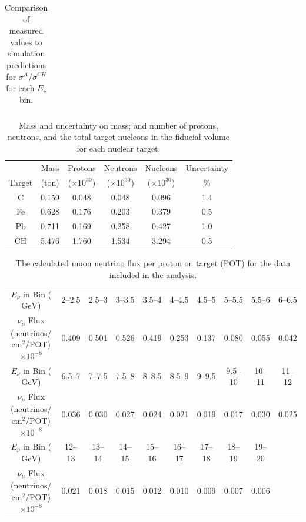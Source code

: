 \documentclass[aps,preprint,showpacs,superscriptaddress]{revtex4} %
\newcommand{\numu}{\ensuremath{\nu_{\mu}}\xspace}
\newcommand{\GeV}{\ensuremath{\mbox{GeV}}\xspace}
\newcommand{\cmsq}{\ensuremath{\mbox{cm}^2}\xspace}
\newcommand{\Enu}{\ensuremath{E_{\nu}}\xspace}
\begin{document}
\begin{table}[!ht]
\begin{center}
\begin{tabular}{ccccccc}
\hline\hline
\end{tabular}
\end{center}
\caption{Comparison of measured values to simulation predictions for $\sigma^{A}/\sigma^{CH}$ for each \Enu bin.}
\label{tab:enu_results_table}
\end{table}

\begingroup
\squeezetable
\begin{table}
\begin{tabular}{cccccc}
\hline \hline
& Mass  & Protons             & Neutrons           & Nucleons & Uncertainty\\
Target & (ton) &  ($\times 10^{30}$) & ($\times 10^{30}$) & ($\times 10^{30}$) & \% \\
    \hline
    C  & 0.159 & 0.048 & 0.048 & 0.096 & 1.4 \\
    Fe & 0.628 & 0.176 & 0.203 & 0.379 & 0.5 \\
    Pb & 0.711 & 0.169 & 0.258 & 0.427 & 1.0 \\
    CH & 5.476 & 1.760 & 1.534 & 3.294 & 0.5 \\
      \hline \hline
      \end{tabular}
      \caption{Mass and uncertainty on mass; and number of protons, neutrons, and the total target nucleons in the fiducial volume for each nuclear target.}
      \label{tab:NumberOfTargets}
      \end{table}
      \endgroup
\begingroup
\squeezetable
\begin{table}
  \begin{tabular}{cccccccccc}
    \hline \hline
    \Enu in Bin (\GeV) & 2--2.5 & 2.5--3 & 3--3.5 & 3.5--4 & 4--4.5 & 4.5--5 & 5--5.5 & 5.5--6 & 6--6.5 \\
    \numu Flux (neutrinos/\cmsq/POT)$\times10^{-8}$ & 0.409 & 0.501 & 0.526 & 0.419 & 0.253 & 0.137 & 0.080 & 0.055 & 0.042 \\
    \hline
    \Enu in Bin (\GeV) & 6.5--7 & 7--7.5 & 7.5--8 & 8--8.5 & 8.5--9 & 9--9.5 & 9.5--10 & 10--11 & 11--12 \\
    \numu Flux (neutrinos/\cmsq/POT)$\times10^{-8}$ & 0.036 & 0.030 & 0.027 & 0.024 & 0.021 & 0.019 & 0.017 & 0.030 & 0.025\\
    \hline
    \Enu in Bin (\GeV) & 12--13 & 13--14 & 14--15 & 15--16 & 16--17 & 17--18 & 18--19 & 19--20 & \\
    \numu Flux (neutrinos/\cmsq/POT)$\times10^{-8}$ & 0.021 & 0.018 & 0.015 & 0.012 & 0.010 & 0.009 & 0.007 & 0.006 &  \\
    \hline \hline
  \end{tabular}
  \caption{The calculated muon neutrino flux per proton on target (POT) for the data included in the analysis.}
  \label{tab:nu_flux_fine}
  \end{table}
\endgroup
\end{document}
